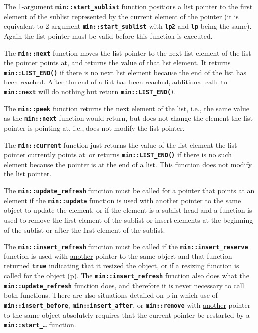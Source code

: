 \documentclass[12pt]{article}
\newcommand{\TT}[1]{{\tt \bfseries #1}}
\newcommand{\pagref}[1]{p\pageref{#1}}
\newcommand{\EOL}{\penalty \exhyphenpenalty}
\begin{document}
The 1-argument \TT{min::\EOL start\_\EOL sublist} function
positions a list pointer
to the first element of the sublist represented by the current
element of the pointer (it is equivalent to 2-argument
\TT{min::\EOL start\_\EOL sublist} with \TT{lp2} and \TT{lp} being
the same).
Again the list pointer must be valid before this function is executed.

The \TT{min::\EOL next} function moves the list pointer
to the next list element of the
list the pointer points at, and returns the value of that
list element.  It returns \TT{min::\EOL LIST\_\EOL END()} if there is
no next list element because the end of the list has been reached.
After the end of a list has been reached, additional
calls to \TT{min::next}
will do nothing but return \TT{min::\EOL LIST\_\EOL END()}.

The \TT{min::\EOL peek} function returns the next element of the
list, i.e., the
same value as the \TT{min::\EOL next} function would return, but does not
change the element the list pointer is pointing at, i.e., does not
modify the list pointer.

The \TT{min::current} function just returns the value of the list
element the list pointer currently points at, or returns
\TT{min::\EOL LIST\_\EOL END()}
if there is no such element because the pointer is at the end of a list.
This function does not modify the list pointer.

The \TT{min::update\_\EOL refresh}
function must be called for
a pointer that points at an element if the \TT{min::\EOL update} function
is used with \underline{another} pointer to the same object to update
the element, or if the element is a sublist head and a function is used
to remove the first element of the sublist or insert elements at the
beginning of the sublist or after the first element of the sublist.

The \TT{min::\EOL insert\_\EOL refresh} function must be called if the
\TT{min::\EOL insert\_\EOL reserve} function is used with \underline{another}
pointer to the same object and that function returned \TT{true} indicating
that it resized the object, or if a resizing function is called
for the object (\pagref{RESIZING-FUNCTIONS}).  The 
\TT{min::\EOL insert\_\EOL refresh} function also does what the
\TT{min::\EOL update\_\EOL refresh} function does, and therefore it is
never necessary to call both functions.
There are also situations detailed on \pagref{RESTARTING_LIST_PTR}
in which use of \TT{min::\EOL insert\_\EOL before},
\TT{min::\EOL insert\_\EOL after}, or
\TT{min::\EOL remove} with \underline{another} pointer to the same object
absolutely requires that the current pointer be
restarted by a \TT{min::\EOL start\_\ldots} function.
\end{document}
